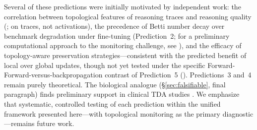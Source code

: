 \documentclass{article}
\begin{document}
Several of these predictions were initially motivated by independent work: the correlation between topological features of reasoning traces and reasoning quality (\citet{Tan2025shape}; on traces, not activations), the precedence of Betti number decay over benchmark degradation under fine-tuning (Prediction~2; for a preliminary computational approach to the monitoring challenge, see \citet{Kalinowski2026collapse}), and the efficacy of topology-aware preservation strategies---consistent with the predicted benefit of local over global updates, though not yet tested under the specific Forward-Forward-versus-backpropagation contrast of Prediction~5 (\citep{Zang2026topology}). Predictions~3 and~4 remain purely theoretical. The biological analogue (\S\ref{sec:falsifiable}, final paragraph) finds preliminary support in clinical TDA studies \citep{Petri2014homological,Sizemore2018cliques,Zhang2026alzheimer,He2025brain}. We emphasize that systematic, controlled testing of each prediction within the unified framework presented here---with topological monitoring as the primary diagnostic---remains future work.
\end{document}
